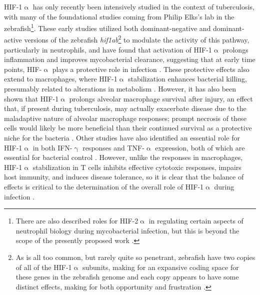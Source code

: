 HIF\hyp{}1$\upalpha$ has only recently been intensively studied in the context of tuberculosis, with many of the foundational studies coming from Philip Elks's lab in the zebrafish\footnote{There are also described roles for HIF\hyp{}2$\upalpha$ in regulating certain aspects of neutrophil biology during mycobacterial infection, but this is beyond the scope of the presently proposed work \citep{Thompson2014, Elks2015}.}. These early studies utilized both dominant\hyp{}negative and dominant\hyp{}active versions of the zebrafish \textit{hif1ab}\footnote{As is all too common, but rarely quite so penetrant, zebrafish have two copies of all of the HIF\hyp{}1$\upalpha$ subunits, making for an expansive coding space for these genes in the zebrafish genome and each copy appears to have some distinct effects, making for both opportunity and frustration \citep{Elks2015}.} to modulate the activity of this pathway, particularly in neutrophils, and have found that activation of HIF\hyp{}1$\upalpha$ prolongs inflammation and improves mycobacterial clearance, suggesting that at early time points, HIF\hyp{}$\upalpha$ plays a protective role in infection \citep{Elks2011, Elks2013, Hammond2020}. These protective effects also extend to macrophages, where HIF\hyp{}1$\upalpha$ stabilization enhances bacterial killing, presumably related to alterations in metabolism \citep{Knight2018, Zenk2021}. However, it has also been shown that HIF\hyp{}1$\upalpha$ prolongs alveolar macrophage survival after injury, an effect that, if present during tuberculosis, may actually exacerbate disease due to the maladaptive nature of alveolar macrophage responses; prompt necrosis of these cells would likely be more beneficial than their continued survival as a protective niche for the bacteria \citep{Leemans2001, Woods2022}. Other studies have also identified an essential role for HIF\hyp{}1$\upalpha$ in both IFN\hyp{}$\upgamma$ responses and TNF\hyp{}$\upalpha$ expression, both of which are essential for bacterial control \citep{Flynn1993, Flynn1995, Braverman2016, Lewis2019}. However, unlike the responses in macrophages, HIF\hyp{}1$\upalpha$ stabilization in T cells inhibits effective cytotoxic responses, impairs host immunity, and induces disease tolerance, so it is clear that the balance of effects is critical to the determination of the overall role of HIF\hyp{}1$\upalpha$ during infection \citep{Tzelepis2018, Liu2022b}.

